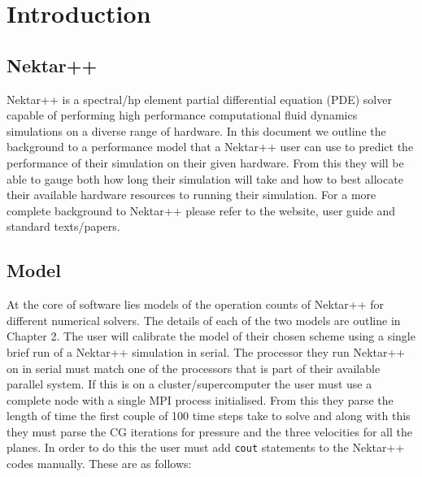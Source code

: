 
\chapter{Introduction} %

\label{Chapter1} %


\newcommand{\keyword}[1]{\textbf{#1}}
\newcommand{\tabhead}[1]{\textbf{#1}}
\newcommand{\code}[1]{\texttt{#1}}
\newcommand{\file}[1]{\texttt{\bfseries#1}}
\newcommand{\option}[1]{\texttt{\itshape#1}}


\section{Nektar++}
Nektar++ is a spectral/hp element partial differential equation (PDE) solver capable of performing high performance computational fluid dynamics simulations on a diverse range of hardware. In this document we outline the background to a performance model that a Nektar++ user can use to predict the performance of their simulation on their given hardware. From this they will be able to gauge both how long their simulation will take and how to best allocate their available hardware resources to running their simulation. For a more complete background to Nektar++ please refer to the website, user guide and standard texts/papers.

\section{Model}
At the core of software lies models of the operation counts of Nektar++ for different numerical solvers. The details of each of the two models are outline in Chapter 2. The user will calibrate the model of their chosen scheme using a single brief run of a Nektar++ simulation in serial. The processor they run Nektar++ on in serial must match one of the processors that is part of their available parallel system. If this is on a cluster/supercomputer the user must use a complete node with a single MPI process initialised. From this they parse the length of time the first couple of 100 time steps take to solve and along with this they must parse the CG iterations for pressure and the three velocities for all the planes. In order to do this the user must add \code{cout} statements to the Nektar++ codes manually. These are as follows:

